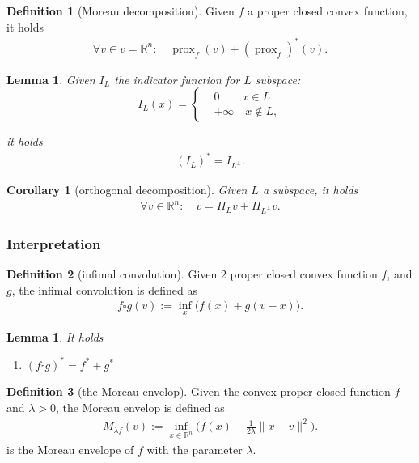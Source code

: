 \documentclass[a4paper,11pt,fleqn, draft]{book}
\newtheorem{corollary}{Corollary}[theorem]
\newtheorem{lemma}[theorem]{Lemma}
\theoremstyle{definition}
\newtheorem{definition}{Definition}[section]
\theoremstyle{remark}
\DeclareMathOperator*{\prox}{prox}
\begin{document}
\begin{definition}[Moreau decomposition]
	Given $f$ a proper closed convex function, it holds
	\begin{align*}
		\forall v \in v =  \mathbb{R}^n: \quad \prox_f(v) + (\prox_f)^*(v). 
	\end{align*}
\end{definition}

\begin{lemma}
	Given $I_L$ the indicator function for $L$ subspace:
	\begin{equation*}
	I_L(x)=\left\{
	\begin{aligned}
		& 0 \qquad x \in L\\
		& + \infty \quad x \notin L, 
	\end{aligned}	
	\right.	
	\end{equation*}

	it holds
	\begin{align*}
		(I_L)^* = I_{L^\perp}. 
	\end{align*}
\end{lemma}

\begin{corollary}[orthogonal decomposition]
	Given $L$ a subspace, it holds
	\begin{align*}
		\forall v \in \mathbb{R}^n: \quad v = \Pi_{L} v + \Pi_{L^\perp}v . 
	\end{align*}
\end{corollary}


\subsubsection{Interpretation}
\begin{definition}[infimal convolution]
	Given 2 proper closed convex function $f$, and $g$, the infimal convolution is defined as 
	\begin{align*}
		f \square g(v):= \inf_x \bigg( f(x) +  g(v - x) \bigg). 
	\end{align*}
\end{definition}

\begin{lemma}
	It holds
	\begin{enumerate}
		\item $(f \square g)^* = f^* + g^*$
	\end{enumerate}
\end{lemma}

\begin{definition}[the Moreau envelop]
	Given the convex proper closed function $f$ and $\lambda > 0$, the Moreau envelop is defined as 
	\begin{align*}
		M_{\lambda f}(v):= \inf_{x \in \mathbb{R}^n} \bigg( f (x) + \frac{1}{2 \lambda} \|x - v\|^2\bigg). 
	\end{align*}
	is the Moreau envelope of $f$ with the parameter $\lambda$. 
\end{definition}
\end{document}
